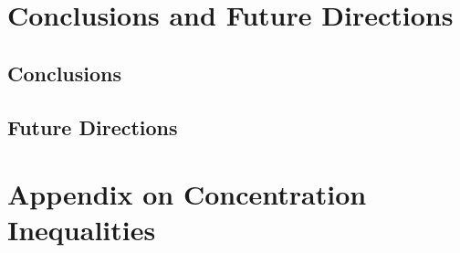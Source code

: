 \documentclass[MS,twoside]{iitmdiss}
\newcommand{\clearemptydoublepage}{\newpage{\cleardoublepage}}
\begin{document}

\clearemptydoublepage
\chapter{Conclusions and Future Directions}
\label{ThesisConc}

\section{Conclusions}


\section{Future Directions}



\appendix

\clearemptydoublepage
\chapter{Appendix on Concentration Inequalities}
\label{sec:app:Conc}



%

\clearemptydoublepage
\begin{singlespace}


\end{singlespace}



\clearemptydoublepage
\listofpapers

\end{document}
